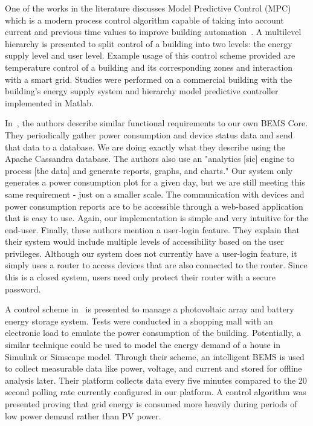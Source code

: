 One of the works in the literature discusses Model Predictive Control (MPC) which is a modern process control algorithm capable of taking into account current and previous time values to improve building automation~\cite{Mayer2017}. A multilevel hierarchy is presented to split control of a building into two levels: the energy supply level and user level. Example usage of this control scheme provided are temperature control of a building and its corresponding zones and interaction with a smart grid. Studies were performed on a commercial building with the building's energy supply system and hierarchy model predictive controller implemented in Matlab.

In~\cite{8246800}, the authors describe similar functional requirements to our own BEMS Core. They periodically gather power consumption and device status data and send that data to a database. We are doing exactly what they describe using the Apache Cassandra database. The authors also use an "analytics [sic] engine to process [the data] and generate reports, graphs, and charts." Our system only generates a power consumption plot for a given day, but we are still meeting this same requirement - just on a smaller scale. The communication with devices and power consumption reports are to be accessible through a web-based application that is easy to use. Again, our implementation is simple and very intuitive for the end-user. Finally, these authors mention a user-login feature. They explain that their system would include multiple levels of accessibility based on the user privileges. Although our system does not currently have a user-login feature, it simply uses a router to access devices that are also connected to the router. Since this is a closed system, users need only protect their router with a secure password.

A control scheme in~\cite{Barchi2018} is presented to manage a photovoltaic array and battery energy storage system. Tests were conducted in a shopping mall with an electronic load to emulate the power consumption of the building. Potentially, a similar technique could be used to model the energy demand of a house in Simulink or Simscape model. Through their scheme, an intelligent BEMS is used to collect measurable data like power, voltage, and current and stored for offline analysis later. Their platform collects data every five minutes compared to the 20 second polling rate currently configured in our platform. A control algorithm was presented proving that grid energy is consumed more heavily during periods of low power demand rather than PV power.

